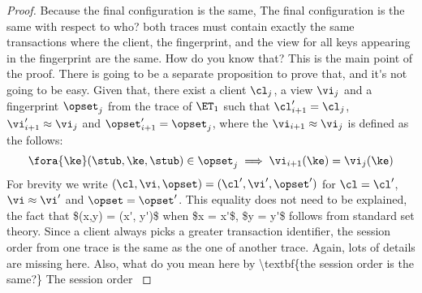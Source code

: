 \begin{proof}
Because the final configuration is the same, 
\ac{The final configuration is the same with respect to who?}
both traces must contain exactly the same transactions where the client, the fingerprint, and the view for all keys appearing in the fingerprint are the same.
\ac{How do you know that? This is the main point of the proof. There is going to be a separate proposition to prove that, and it's not going to be 
easy.}
Given that, there exist a client \( \cl_j \), a view \( \vi_j \) and a fingerprint \( \opset_j \) from the trace of \( \ET_1 \) such that \( \cl'_{i+1} = \cl_{j} \), \( \vi'_{i+1} \approx \vi_j \) and \( \opset'_{i+1} = \opset_{j}\), where the \( \vi_{i+1} \approx \vi_j \) is defined as the follows:
\[
    \fora{\ke} (\stub, \ke, \stub) \in \opset_j \implies \vi_{i+1}(\ke) = \vi_j(\ke)
\]
For brevity we write \( (\cl, \vi, \opset) = (\cl', \vi', \opset') \) for \( \cl = \cl' \), \( \vi \approx \vi' \) and \( \opset = \opset'\).
\ac{This equality does not need to be explained, the fact that $(x,y) = (x', y')$ when $x = x'$, $y = y'$ follows from standard 
set theory.}
Since a client always picks a greater transaction identifier, the session order from one trace is the same as the one of another trace.
\ac{Again, lots of details are missing here. Also, what do you mean here by \textbf{the session order is the same?} The session order 
}
\end{proof}
